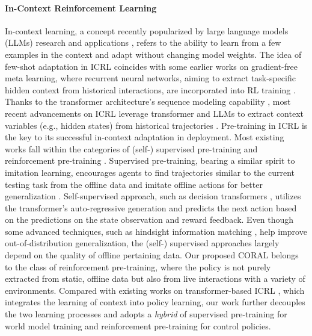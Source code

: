 \documentclass[letterpaper]{article}
\begin{document}
\paragraph{In-Context Reinforcement Learning} In-context learning, a concept recently popularized by large language models (LLMs) research and applications \cite{dong-etal-2024-survey, tao-qz24symbiotic}, refers to the ability to learn from a few examples in the context and adapt without changing model weights. The idea of few-shot adaptation in ICRL coincides with some earlier works on gradient-free meta learning, where recurrent neural networks, aiming to extract task-specific hidden context from historical interactions, are incorporated into RL training \cite{botvinick16learnRL, abbeel16rl2}.
Thanks to the transformer architecture's sequence modeling capability \cite{vaswani2017attention}, most recent advancements on ICRL leverage transformer and LLMs to extract context variables (e.g., hidden states) from historical trajectories \cite{lee2023supervised, tao23sce, krishnamurthy2024can}. Pre-training in ICRL is the key to its successful in-context adaptation in deployment. Most existing works fall within the categories of (self-) supervised pre-training and reinforcement pre-training \cite{moeini2025survey}.
Supervised pre-training, bearing a similar spirit to imitation learning, encourages agents to find trajectories similar to the current testing task from the offline data and imitate offline actions for better generalization \cite{raparthy24icrl, xu22prompt-dt}. Self-supervised approach, such as decision transformers \cite{chen2021dt, huang2024decision}, utilizes the transformer's auto-regressive generation and predicts the next action based on the predictions on the state observation and reward feedback. Even though some advanced techniques, such as hindsight information matching \cite{furuta21generalDT, tao23sce}, help improve out-of-distribution generalization, the (self-) supervised approaches largely depend on the quality of offline pertaining data.
Our proposed CORAL belongs to the class of reinforcement pre-training, where the policy is not purely extracted from static, offline data but also from live interactions with a variety of environments. Compared with existing works on transformer-based ICRL \cite{bauer23,grigsby2024amago,  wang2024transformers}, which integrates the learning of context into policy learning, our work further decouples the two learning processes and adopts a \textit{hybrid} of supervised pre-training for world model training and reinforcement pre-training for control policies.
\end{document}
